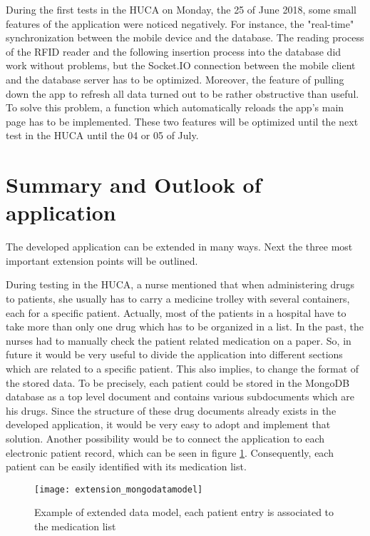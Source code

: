 During the first tests in the HUCA on Monday, the 25 of June 2018, some small features of the application were noticed negatively. For instance, the "real-time" synchronization between the mobile device and the database. The reading process of the RFID reader and the following insertion process into the database did work without problems, but the Socket.IO connection between the mobile client and the database server has to be optimized. Moreover, the feature of pulling down the app to refresh all data turned out to be rather obstructive than useful. To solve this problem, a function which automatically reloads the app's main page has to be implemented. These two features will be optimized until the next test in the HUCA until the 04 or 05 of July.

\section{Summary and Outlook of application}

The developed application can be extended in many ways. Next the three most important extension points will be outlined.

During testing in the HUCA, a nurse mentioned that when administering drugs to patients, she usually has to carry a medicine trolley with several containers, each for a specific patient. Actually, most of the patients in a hospital have to take more than only one drug which has to be organized in a list. In the past, the nurses had to manually check the patient related medication on a paper.
So, in future it would be very useful to divide the application into different sections which are related to a specific patient. This also implies, to change the format of the stored data. To be precisely, each patient could be stored in the MongoDB database as a top level document and contains various subdocuments which are his drugs. Since the structure of these drug documents already exists in the developed application, it would be very easy to adopt and implement that solution. Another possibility would be to connect the application to each electronic patient record, which can be seen in figure \ref{fig:newdatamodel}. Consequently, each patient can be easily identified with its medication list.

\begin{figure}
\centering
\texttt{[image: extension\_mongodatamodel]} 
\caption{\label{fig:newdatamodel}Example of extended data model, each patient entry is associated to the medication list} 
\end{figure}

